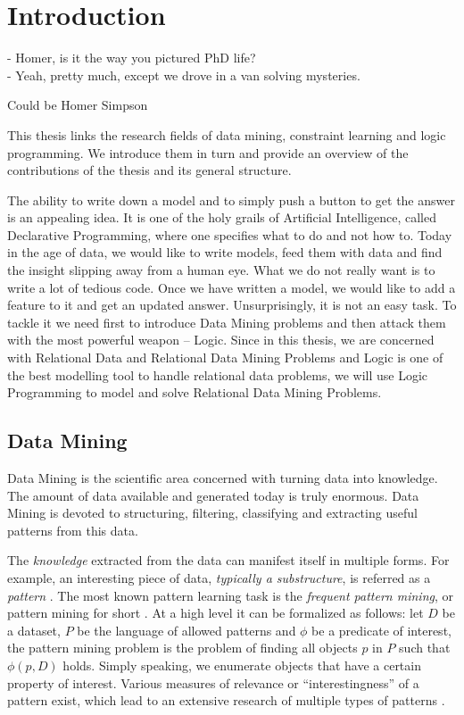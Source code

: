 \chapter{Introduction}\label{ch:introduction}
\epigraph{
- Homer, is it the way you pictured PhD life?\\
- Yeah, pretty much, except we drove in a van solving mysteries.
}{Could be Homer Simpson}

\begin{addmargin}[2em]{2em}
This thesis links the research fields of data mining, constraint learning
and logic programming. We introduce them in turn and provide an overview of the
contributions of the thesis and
its general structure.
\end{addmargin}

The ability to write down a model and to simply push a button to get the
answer is an appealing idea. It is one of the holy grails of
Artificial Intelligence, called Declarative Programming, where one
specifies what to do and not how to. Today in the age of data, we would like
to write models, feed them with data and find the insight slipping
away from a human eye. What we do not really want is to write
a lot of tedious code. Once we have written a model, we would like
to add a feature to it and get an updated answer. Unsurprisingly, it is
not an easy task. To tackle it we need first to introduce Data Mining
problems and then attack them with the most powerful weapon -- Logic.
Since in this thesis, we are
concerned with Relational Data and Relational Data Mining Problems 
and Logic is one of the best modelling tool to handle relational data
problems, we will use Logic Programming to model and solve Relational
Data Mining Problems.

\section{Data Mining}
Data Mining is the scientific area concerned with turning data into knowledge. 
The amount of data available and generated today is truly enormous. 
Data Mining is devoted to structuring, filtering, classifying and extracting useful patterns from this data.

The \textit{knowledge} extracted from the data can manifest itself in
multiple forms. For example, an interesting piece of data,
\textit{typically a substructure}, is referred as a \textit{pattern} \parencite{han_book}. 
The most known pattern learning task is the
\textit{frequent pattern mining}, or pattern mining for short \parencite{survey_han}. 
At a high level it can be formalized as follows: 
let $D$ be a dataset, $P$ be the language of allowed patterns and
$\phi$ be a predicate of
interest, the pattern mining problem is the problem of finding
all objects $p$ in $P$ such that $\phi(p,D)$ holds.
Simply speaking, we enumerate objects that have a certain property of
interest.
Various measures of relevance or ``interestingness'' of a pattern exist, which lead to an extensive research of multiple types of patterns \parencite{tias_topk}.


